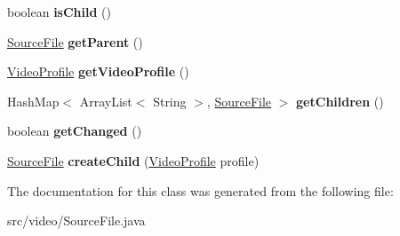 \begin{DoxyCompactItemize}
\item 
\hypertarget{classvideo_1_1_source_file_ae3f5c409a9c2f00b9894b55d9773690c}{
boolean {\bfseries isChild} ()}
\label{classvideo_1_1_source_file_ae3f5c409a9c2f00b9894b55d9773690c}

\item 
\hypertarget{classvideo_1_1_source_file_a5158bbcce8dad9f0b6d83d4a9c12afc9}{
\hyperlink{classvideo_1_1_source_file}{SourceFile} {\bfseries getParent} ()}
\label{classvideo_1_1_source_file_a5158bbcce8dad9f0b6d83d4a9c12afc9}

\item 
\hypertarget{classvideo_1_1_source_file_a9d6a7a24dd84777ed864455a7cfefcd6}{
\hyperlink{classvideo_1_1_video_profile}{VideoProfile} {\bfseries getVideoProfile} ()}
\label{classvideo_1_1_source_file_a9d6a7a24dd84777ed864455a7cfefcd6}

\item 
\hypertarget{classvideo_1_1_source_file_a7e7259f35a0a2bce55466ebf56ae1c7f}{
HashMap$<$ ArrayList$<$ String $>$, \hyperlink{classvideo_1_1_source_file}{SourceFile} $>$ {\bfseries getChildren} ()}
\label{classvideo_1_1_source_file_a7e7259f35a0a2bce55466ebf56ae1c7f}

\item 
\hypertarget{classvideo_1_1_source_file_ad609d9adc5e77b9f314602551f6aaa10}{
boolean {\bfseries getChanged} ()}
\label{classvideo_1_1_source_file_ad609d9adc5e77b9f314602551f6aaa10}

\item 
\hypertarget{classvideo_1_1_source_file_a440d8242eb93be43368e649710aa6179}{
\hyperlink{classvideo_1_1_source_file}{SourceFile} {\bfseries createChild} (\hyperlink{classvideo_1_1_video_profile}{VideoProfile} profile)}
\label{classvideo_1_1_source_file_a440d8242eb93be43368e649710aa6179}

\end{DoxyCompactItemize}


The documentation for this class was generated from the following file:\begin{DoxyCompactItemize}
\item 
src/video/SourceFile.java\end{DoxyCompactItemize}

